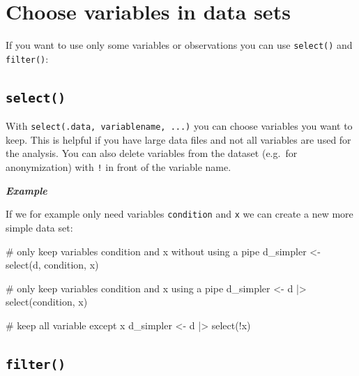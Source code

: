 \documentclass[
  letterpaper,
  DIV=11,
  numbers=noendperiod]{scrreprt}
\newenvironment{Shaded}{\begin{snugshade}}{\end{snugshade}}
\newcommand{\CommentTok}[1]{\textcolor[rgb]{0.37,0.37,0.37}{#1}}
\newcommand{\FunctionTok}[1]{\textcolor[rgb]{0.28,0.35,0.67}{#1}}
\newcommand{\NormalTok}[1]{\textcolor[rgb]{0.00,0.23,0.31}{#1}}
\newcommand{\OtherTok}[1]{\textcolor[rgb]{0.00,0.23,0.31}{#1}}
\newcommand{\SpecialCharTok}[1]{\textcolor[rgb]{0.37,0.37,0.37}{#1}}
\begin{document}
\hfill\break

\hypertarget{choose-variables-in-data-sets}{%
\section{Choose variables in data
sets}\label{choose-variables-in-data-sets}}

If you want to use only some variables or observations you can use
\texttt{select()} and \texttt{filter()}:

\hypertarget{select}{%
\subsection{\texorpdfstring{\texttt{select()}}{select()}}\label{select}}

With \texttt{select(.data,\ variablename,\ ...)} you can choose
variables you want to keep. This is helpful if you have large data files
and not all variables are used for the analysis. You can also delete
variables from the dataset (e.g.~for anonymization) with \texttt{!} in
front of the variable name.

\textbf{\emph{Example}}

If we for example only need variables \texttt{condition} and \texttt{x}
we can create a new more simple data set:

\begin{Shaded}
\begin{Highlighting}[]
\CommentTok{\# only keep variables condition and x without using a pipe}
\NormalTok{d\_simpler }\OtherTok{\textless{}{-}} \FunctionTok{select}\NormalTok{(d, condition, x)}

\CommentTok{\# only keep variables condition and x using a pipe}
\NormalTok{d\_simpler }\OtherTok{\textless{}{-}}\NormalTok{ d }\SpecialCharTok{|\textgreater{}} \FunctionTok{select}\NormalTok{(condition, x)}

\CommentTok{\# keep all variable except x}
\NormalTok{d\_simpler }\OtherTok{\textless{}{-}}\NormalTok{ d }\SpecialCharTok{|\textgreater{}} \FunctionTok{select}\NormalTok{(}\SpecialCharTok{!}\NormalTok{x)}
\end{Highlighting}
\end{Shaded}

\hypertarget{filter}{%
\subsection{\texorpdfstring{\texttt{filter()}}{filter()}}\label{filter}}
\end{document}
